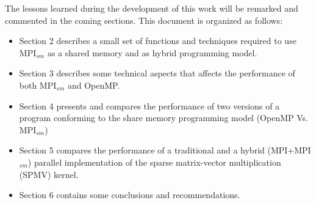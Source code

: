 \medskip

The lessons learned during the development of this work will be remarked and commented in the coming sections. This document is organized as follows:

\begin{itemize} 
\item Section 2 describes a small set of functions and techniques required to use MPI$_{sm}$ as a shared memory and as hybrid programming model.

\item Section 3 describes some technical aspects that affects the performance of both MPI$_{sm}$ and OpenMP.

\item Section 4 presents and compares the performance of two versions of a program conforming to the share memory programming model (OpenMP Vs. MPI$_{sm}$)

\item Section 5 compares the performance of a traditional and a hybrid (MPI+MPI$_{sm}$) parallel implementation of the sparse matrix-vector multiplication (SPMV) kernel.

\item Section 6 contains some conclusions and recommendations.


\end{itemize}








